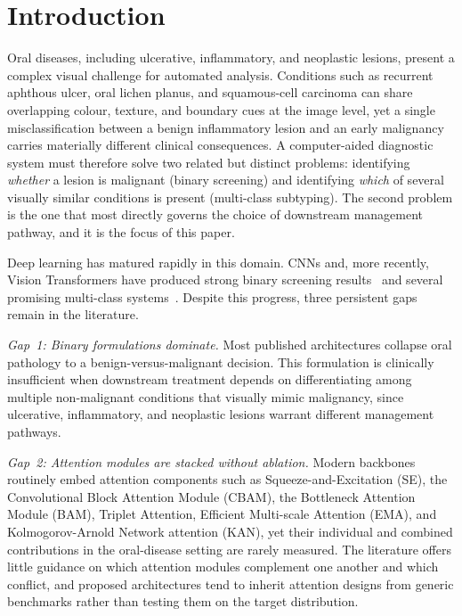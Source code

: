 \section{Introduction}\label{sec:intro}

Oral diseases, including ulcerative, inflammatory, and
neoplastic lesions, present a complex visual challenge for automated
analysis. Conditions such as recurrent aphthous ulcer, oral lichen planus, and
squamous-cell carcinoma can share overlapping colour, texture, and boundary
cues at the image level, yet a single misclassification between a benign
inflammatory lesion and an early malignancy carries materially different
clinical consequences. A computer-aided diagnostic system must therefore solve
two related but distinct problems: identifying \emph{whether} a lesion is
malignant (binary screening) and identifying \emph{which} of several
visually similar conditions is present (multi-class subtyping). The second
problem is the one that most directly governs the choice of downstream
management pathway, and it is the focus of this paper.

Deep learning has matured rapidly in this domain. CNNs and, more recently,
Vision Transformers have produced strong binary screening
results~\cite{ref5,ref16,ref17} and several promising multi-class
systems~\cite{ref19,ref22}. Despite this progress, three persistent gaps remain
in the literature.

\emph{Gap~1: Binary formulations dominate.} Most published architectures
collapse oral pathology to a benign-versus-malignant decision. This formulation
is clinically insufficient when downstream treatment depends on differentiating
among multiple non-malignant conditions that visually mimic malignancy, since
ulcerative, inflammatory, and neoplastic lesions warrant different management
pathways.

\emph{Gap~2: Attention modules are stacked without ablation.} Modern
backbones routinely embed attention components such as Squeeze-and-Excitation
(SE), the Convolutional Block Attention Module (CBAM), the Bottleneck Attention
Module (BAM), Triplet Attention, Efficient Multi-scale Attention (EMA), and
Kolmogorov-Arnold Network attention (KAN), yet their individual and combined
contributions in the oral-disease setting are rarely measured. The literature
offers little guidance on which attention modules complement one another and
which conflict, and proposed architectures tend to inherit attention designs
from generic benchmarks rather than testing them on the target distribution.

